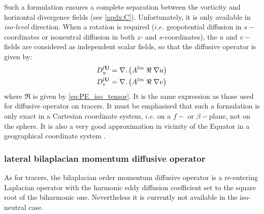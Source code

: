 \documentclass[../main/NEMO_manual]{subfiles}
\begin{document}
Such a formulation ensures a complete separation between the vorticity and horizontal divergence fields
(see \autoref{apdx:C}).
Unfortunately, it is only available in \textit{iso-level} direction.
When a rotation is required
($i.e.$ geopotential diffusion in $s-$coordinates or isoneutral diffusion in both $z$- and $s$-coordinates),
the $u$ and $v-$fields are considered as independent scalar fields, so that the diffusive operator is given by:
\[
  \begin{split}
    D_u^{l{\rm {\bf U}}} &= \nabla .\left( {A^{lm} \;\Re \;\nabla u} \right) \\
    D_v^{l{\rm {\bf U}}} &= \nabla .\left( {A^{lm} \;\Re \;\nabla v} \right)
  \end{split}
\]
where $\Re$ is given by \autoref{eq:PE_iso_tensor}.
It is the same expression as those used for diffusive operator on tracers.
It must be emphasised that such a formulation is only exact in a Cartesian coordinate system,
$i.e.$ on a $f-$ or $\beta-$plane, not on the sphere.
It is also a very good approximation in vicinity of the Equator in
a geographical coordinate system \citep{Lengaigne_al_JGR03}.

\subsubsection{lateral bilaplacian momentum diffusive operator}

As for tracers, the bilaplacian order momentum diffusive operator is a re-entering Laplacian operator with
the harmonic eddy diffusion coefficient set to the square root of the biharmonic one.
Nevertheless it is currently not available in the iso-neutral case.

\biblio
\end{document}
